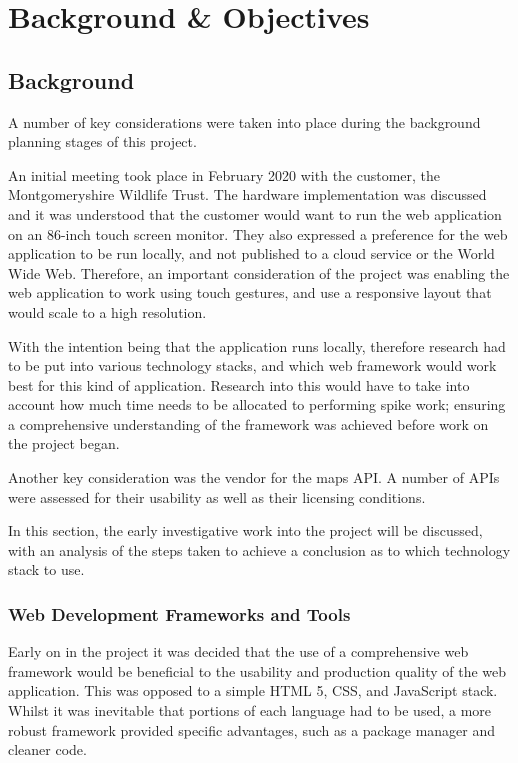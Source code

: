 \chapter{Background \& Objectives}

\section{Background}

A number of key considerations were taken into place during the background planning stages of this project.

An initial meeting took place in February 2020 with the customer, the Montgomeryshire Wildlife Trust. The hardware implementation was discussed and it was understood that the customer would want to run the web application on an 86-inch touch screen monitor. They also expressed a preference for the web application to be run locally, and not published to a cloud service or the World Wide Web. Therefore, an important consideration of the project was enabling the web application to work using touch gestures, and use a responsive layout that would scale to a high resolution.

With the intention being that the application runs locally, therefore research had to be put into various technology stacks, and which web framework would work best for this kind of application. Research into this would have to take into account how much time needs to be allocated to performing spike work; ensuring a comprehensive understanding of the framework was achieved before work on the project began.

Another key consideration was the vendor for the maps API. A number of APIs were assessed for their usability as well as their licensing conditions.

In this section, the early investigative work into the project will be discussed, with an analysis of the steps taken to achieve a conclusion as to which technology stack to use. 

\subsection{Web Development Frameworks and Tools}

Early on in the project it was decided that the use of a comprehensive web framework would be beneficial to the usability and production quality of the web application. This was opposed to a simple HTML 5, CSS, and JavaScript stack. Whilst it was inevitable that portions of each language had to be used, a more robust framework provided specific advantages, such as a package manager and cleaner code.

